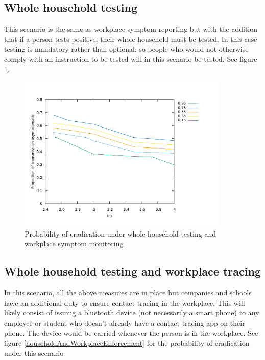 \documentclass{article}
\begin{document}
\subsection{Whole household testing}

This scenario is the same as workplace symptom reporting but with the addition that if a person tests positive, their whole household must be tested. In this case testing is mandatory rather than optional, so people who would not otherwise comply with an instruction to be tested will in this scenario be tested. See figure \ref{householdAndWorkplaceSymptom}.

\begin{figure}
\begin{center}
\includegraphics[width = 10cm]{householdEnforcement.pdf}
\end{center}
\caption{Probability of eradication under whole household testing and workplace symptom monitoring}
\label{householdAndWorkplaceSymptom}
\end{figure}

\subsection{Whole household testing and workplace tracing}

In this scenario, all the above measures are in place but companies and schools have an additional duty to ensure contact tracing in the workplace. This will likely consist of issuing a bluetooth device (not necessarily a smart phone) to any employee or student who doesn't already have a contact-tracing app on their phone. The device would be carried whenever the person is in the workplace. See figure \ref{householdAndWorkplaceEnforcement} for the probability of eradication under this scenario
\end{document}
